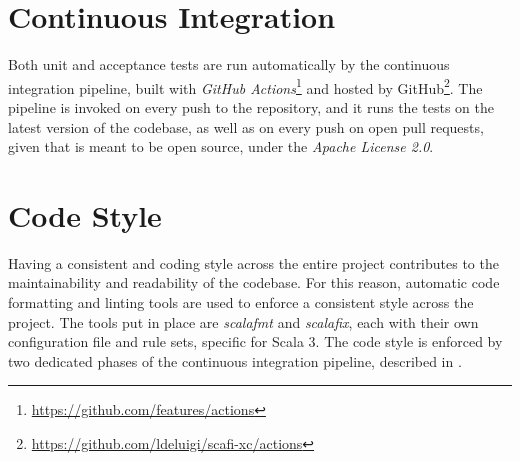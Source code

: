 \section{Continuous Integration} \label{chap:evaluation->sec:continuous-integration}

Both unit and acceptance tests are run automatically by the continuous integration pipeline, built with \textit{GitHub Actions}\footnote{\url{https://github.com/features/actions}} and hosted by GitHub\footnote{\url{https://github.com/ldeluigi/scafi-xc/actions}}.
%
The pipeline is invoked on every push to the repository, and it runs the tests on the latest version of the codebase, as well as on every push on open pull requests, given that \this is meant to be open source, under the \textit{Apache License 2.0}.


\section{Code Style} \label{chap:evaluation->sec:code-style}

Having a consistent and  coding style across the entire project contributes to the maintainability and readability of the codebase.
%
For this reason, automatic code formatting and linting tools are used to enforce a consistent style across the project.
%
The tools put in place are \textit{scalafmt} and \textit{scalafix}, each with their own configuration file and rule sets, specific for Scala 3.
%
The code style is enforced by two dedicated phases of the continuous integration pipeline, described in .

